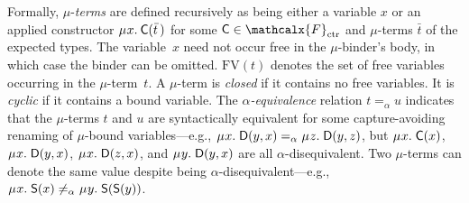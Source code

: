 \documentclass[smallcondensed,draft]{svjour3}
\newcommand\MU{\vvthinspace\mu\vvthinspace}
\newcommand\FV{\mathrm{FV}}
\newcommand\const[1]{\textsf{#1}}
\renewcommand{\vec}[1]{\bar #1}
\newcommand{\rn}[1]{\textsf{#1}}
\newcommand{\aequiv}{\mathrel{=_\alpha}}
\newcommand\Types{\mathcalx{Y}}
\newcommand\Funcs{\mathcalx{F}}
\newcommand\Codata{\Types_{\mathrm{codt}}}
\newcommand\Nondata{\Types_{\mathrm{ord}}}
\newcommand\Ctr{\Funcs_{\smash{\mathrm{ctr}}}}
\newcommand\vvthinspace{\kern+0.041667em}
\begin{document}
Formally, $\mu$-\emph{terms} are defined recursively as being either a variable $x$
or an applied constructor
$\MU x.\: \const{C}( \vec t\, )$ for some $\const{C} \in \Ctr$ and
$\mu$-terms $\vec t$ of the expected types.
The variable~$x$ need not occur free in the $\mu$-binder's body, in which case
the binder can be omitted.
$\FV( t )$ denotes the set of free variables occurring in the $\mu$-term~$t$.
A $\mu$-term is \emph{closed} if %
it contains no free variables. It is \emph{cyclic} if %
it contains a bound variable. The $\alpha$\emph{-equiv\-alence} relation $t \aequiv u$
indicates that the $\mu$-terms $t$ and $u$
are syntactically equivalent for some capture-avoiding renaming of $\mu$-bound variables---e.g.,
$\MU x.\; \const{D}( y, x ) \aequiv \MU z.\; \const{D}( y, z )$,
but
$\MU x.\; \const{C}( x )$, $\MU x.\; \const{D}( y, x )$, $\MU x.\; \const{D}( z, x )$, and
$\MU y.\; \const{D}( y, x )$ are all $\alpha$-disequivalent.
Two $\mu$-terms can denote the same value despite being $\alpha$-disequivalent---e.g.,
$\MU x.\; \const{S}( x ) \not\aequiv \MU y.\; \const{S}( \const{S}( y ) )$.


%
%
%
\end{document}
